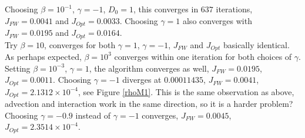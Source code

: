 \documentclass[11pt, a4paper]{article}
\theoremstyle{definition}
\begin{document}
Choosing $\beta = 10^{-1}$, $ \gamma = - 1$, $D_0 = 1$, this converges in $637$ iterations, $J_{FW} = 0.0041$ and $J_{Opt} = 0.0033$. Choosing $\gamma = 1$ also converges with $J_{FW} = 0.0195$ and $J_{Opt} = 0.0164$.\\
Try $\beta = 10$, converges for both $\gamma =1$, $\gamma = -1$, $J_{FW}$ and $J_{Opt}$ basically identical. As perhaps expected, $\beta = 10^3$ converges within one iteration for both choices of $\gamma$.\\
Setting $\beta = 10^{-3}$, $\gamma = 1$, the algorithm converges as well, $J_{FW}= 0.0195$, $J_{Opt} = 0.0011$. Choosing $\gamma = -1$ diverges at $0.00011435$, $J_{FW} = 0.0041$, $J_{Opt}=2.1312 \times 10^{-4}$, see Figure \ref{rhoM1}. This is the same observation as above, advection and interaction work in the same direction, so it is a harder problem?
Choosing $\gamma = - 0.9$ instead of $\gamma = -1$ converges, $J_{FW} = 0.0045$, $J_{Opt} = 2.3514 \times 10^{-4}$. 
\end{document}
